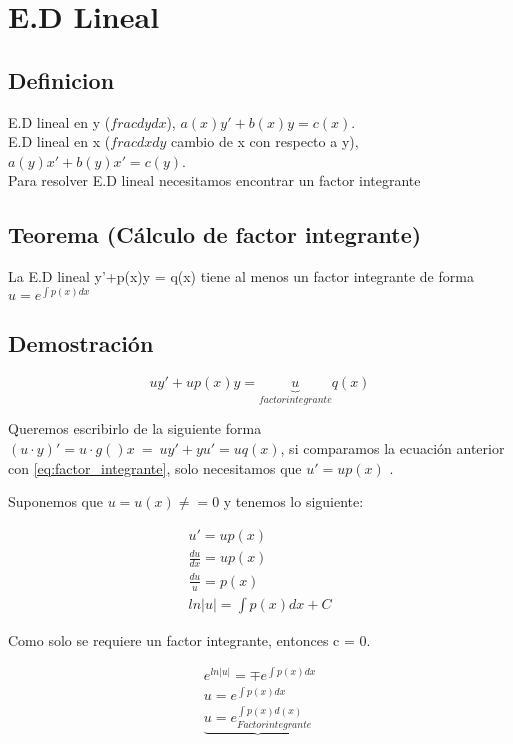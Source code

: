 \documentclass{article}
\begin{document}
\section{E.D Lineal}

\subsection{Definicion}
	E.D lineal en y ($frac{dy}{dx}$),   $a(x)y'+ b(x)y = c(x)$. \\
	E.D lineal en x ($frac{dx}{dy}$ cambio de x con respecto a y),	$a(y)x'+ b(y)x'= c(y)$. \\

Para resolver E.D lineal necesitamos encontrar un factor integrante	

\subsection{Teorema (Cálculo de factor integrante)}

		La E.D lineal y'+p(x)y  = q(x) tiene al menos un factor integrante de forma $u = e^{\int p(x)dx}$

\subsection{Demostración}

	\begin{equation}
		uy'+ up(x)y = \underbrace{u}_{factor integrante}q(x)
		\label{eq:factor_integrante}
	\end{equation}

Queremos escribirlo de la siguiente forma $(u \cdot y )' = u \cdot g()x \ = \ uy' + yu' = uq(x) $, si comparamos la ecuación anterior con \ref{eq:factor_integrante}, solo necesitamos que $u' = up(x)$ . 

Suponemos que $u = u(x) \neq =0$ y tenemos lo siguiente:

\begin{eqnarray}
\nonumber u' = up(x) \\
\nonumber \frac{du}{dx} = up(x) \\
\nonumber \frac{du}{u} = p(x) \\
\nonumber ln|u| = \int  p(x) dx + C
\end{eqnarray}

Como solo se requiere un factor integrante, entonces c = 0.

\begin{eqnarray}
\nonumber e^{ln|u|} = \mp e^{\int p(x) dx}\\
\nonumber u =  e^{\int p(x)dx}\\
\nonumber \underbrace{u = e^{\int p(x) d(x)}_{Factor integrante} }
\end{eqnarray}
\end{document}
